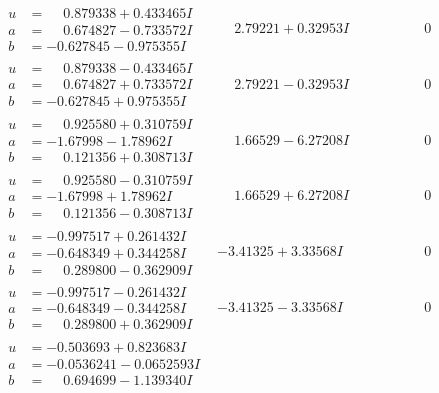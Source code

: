 \documentclass[1p]{elsarticle_modified}
\theoremstyle{definition}
\begin{document}
$$\begin{array}{c|c|c}
\begin{aligned}
u &= \phantom{-}0.879338 + 0.433465 I \\
a &= \phantom{-}0.674827 - 0.733572 I \\
b &= -0.627845 - 0.975355 I\end{aligned}
 & \phantom{-}2.79221 + 0.32953 I & \phantom{-0.000000 } 0 \\ \hline\begin{aligned}
u &= \phantom{-}0.879338 - 0.433465 I \\
a &= \phantom{-}0.674827 + 0.733572 I \\
b &= -0.627845 + 0.975355 I\end{aligned}
 & \phantom{-}2.79221 - 0.32953 I & \phantom{-0.000000 } 0 \\ \hline\begin{aligned}
u &= \phantom{-}0.925580 + 0.310759 I \\
a &= -1.67998 - 1.78962 I \\
b &= \phantom{-}0.121356 + 0.308713 I\end{aligned}
 & \phantom{-}1.66529 - 6.27208 I & \phantom{-0.000000 } 0 \\ \hline\begin{aligned}
u &= \phantom{-}0.925580 - 0.310759 I \\
a &= -1.67998 + 1.78962 I \\
b &= \phantom{-}0.121356 - 0.308713 I\end{aligned}
 & \phantom{-}1.66529 + 6.27208 I & \phantom{-0.000000 } 0 \\ \hline\begin{aligned}
u &= -0.997517 + 0.261432 I \\
a &= -0.648349 + 0.344258 I \\
b &= \phantom{-}0.289800 - 0.362909 I\end{aligned}
 & -3.41325 + 3.33568 I & \phantom{-0.000000 } 0 \\ \hline\begin{aligned}
u &= -0.997517 - 0.261432 I \\
a &= -0.648349 - 0.344258 I \\
b &= \phantom{-}0.289800 + 0.362909 I\end{aligned}
 & -3.41325 - 3.33568 I & \phantom{-0.000000 } 0 \\ \hline\begin{aligned}
u &= -0.503693 + 0.823683 I \\
a &= -0.0536241 - 0.0652593 I \\
b &= \phantom{-}0.694699 - 1.139340 I\end{aligned}

\end{array}$$
\end{document}
